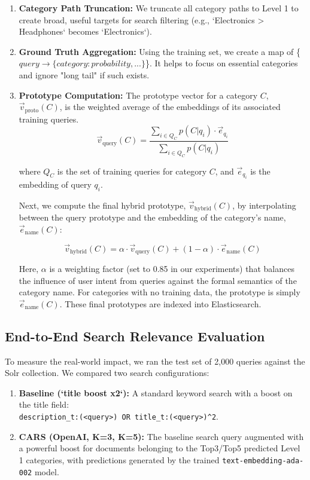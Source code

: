 \documentclass[12pt, a4paper]{article}
\begin{document}
\begin{enumerate}
\item \textbf{Category Path Truncation:} We truncate all category paths to Level 1 to create broad, useful targets for search filtering (e.g., `Electronics \textgreater{} Headphones` becomes `Electronics`).
\item \textbf{Ground Truth Aggregation:} Using the training set, we create a map of \{$query \rightarrow \{category: probability, ...\}$\}. It helps to focus on essential categories and ignore "long tail" if such exists.
\item \textbf{Prototype Computation:} The prototype vector for a category $C$, $\vec{v}_{\text{proto}}(C)$, is the weighted average of the embeddings of its associated training queries.
\begin{equation}
\vec{v}_{\text{query}}(C) = \frac{\sum_{i \in Q_C} p(C|q_i) \cdot \vec{e}_{q_i}}{\sum_{i \in Q_C} p(C|q_i)}
\end{equation}

where $Q_C$ is the set of training queries for category $C$, and $\vec{e}_{q_i}$ is the embedding of query $q_i$.

Next, we compute the final hybrid prototype, $\vec{v}_{\text{hybrid}}(C)$, by interpolating between the query prototype and the embedding of the category's name, $\vec{e}_{\text{name}}(C)$:

\begin{equation}
\vec{v}_{\text{hybrid}}(C) = \alpha \cdot \vec{v}_{\text{query}}(C) + (1-\alpha) \cdot \vec{e}_{\text{name}}(C)
\end{equation}

Here, $\alpha$ is a weighting factor (set to 0.85 in our experiments) that balances the influence of user intent from queries against the formal semantics of the category name. For categories with no training data, the prototype is simply $\vec{e}_{\text{name}}(C)$. These final prototypes are indexed into Elasticsearch.

\end{enumerate}

\subsection{End-to-End Search Relevance Evaluation}

To measure the real-world impact, we ran the test set of 2,000 queries against the Solr collection. We compared two search configurations:

\begin{enumerate}
\item \textbf{Baseline (`title boost x2`):} A standard keyword search with a boost on the title field: \\ \texttt{description\_t:(\textless{}query\textgreater{}) OR title\_t:(\textless{}query\textgreater{})\textasciicircum2}.

\item \textbf{CARS (OpenAI, K=3, K=5):} The baseline search query augmented with a powerful boost for documents belonging to the Top3/Top5 predicted Level 1 categories, with predictions generated by the trained \texttt{text-embedding-ada-002} model.
\end{enumerate}
\end{document}
